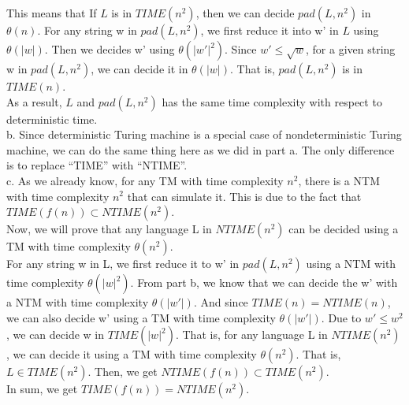\documentclass[12pt]{article}
\begin{document}
This means that If $L$ is in $TIME(n^2)$, then we can decide $pad(L,
n^2)$ in $\theta (n)$. For any string w in $pad(L, n^2)$, we first
reduce it into w' in $L$ using $\theta (|w|)$. Then we decides w' using
$\theta (|w'|^2)$. Since $w' \le \sqrt {w}$, for a given string w in
$pad(L, n^2)$, we can decide it in $\theta (|w|)$. That is, $pad(L,
n^2)$ is in $TIME(n)$. \\

As a result, $L$ and $pad(L, n^2)$ has the same time complexity with
respect to deterministic time.\\

b. Since deterministic Turing machine is a special case of
nondeterministic Turing machine, we can do the same thing here as we
did in part a. The only difference is to replace ``TIME'' with
``NTIME''. \\

c. As we already know, for any TM with time complexity $n^2$, there is
a NTM with time complexity $n^2$ that can simulate it. This is due to
the fact that $TIME(f(n)) \subset NTIME(n^2)$. \\

Now, we will prove that any language L in $NTIME(n^2)$ can be
decided using a TM with time complexity $\theta (n^2)$. \\

For any string w in L, we first reduce it to w' in $pad(L, n^2)$
using a NTM with time complexity $\theta (|w|^2)$. From part b, we
know that we can decide the w' with a NTM with time complexity
$\theta (|w'|)$. And since $TIME(n) = NTIME(n)$, we can also decide w'
using a TM with time complexity $\theta (|w'|)$. Due to $w' \le w^2$,
we can decide w in $TIME(|w|^2)$. That is, for any language L in
$NTIME(n^2)$, we can decide it using a TM with time complexity $\theta
(n^2)$. That is, $L \in TIME(n^2)$. Then, we get $NTIME(f(n)) \subset
TIME(n^2)$. \\

In sum, we get $TIME(f(n)) = NTIME(n^2)$.\\
\end{document}
